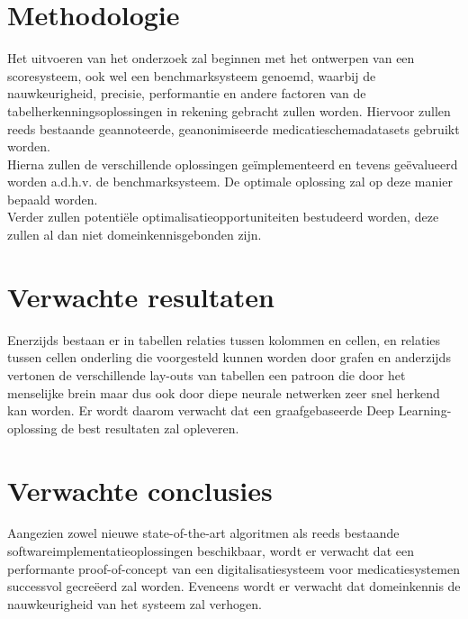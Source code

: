 \section{Methodologie}
\label{sec:methodologie}

Het uitvoeren van het onderzoek zal beginnen met het ontwerpen van een scoresysteem, ook wel een benchmarksysteem genoemd, waarbij de nauwkeurigheid, precisie, performantie en andere factoren van de tabelherkenningsoplossingen in rekening gebracht zullen worden. Hiervoor zullen reeds bestaande geannoteerde, geanonimiseerde medicatieschemadatasets gebruikt worden. \\

\noindent Hierna zullen de verschillende oplossingen geïmplementeerd en tevens geëvalueerd worden a.d.h.v. de benchmarksysteem. De optimale oplossing zal op deze manier bepaald worden.\\

\noindent Verder zullen potentiële optimalisatieopportuniteiten bestudeerd worden, deze zullen al dan niet domeinkennisgebonden zijn.

\section{Verwachte resultaten}
\label{sec:verwachte_resultaten}

Enerzijds bestaan er in tabellen relaties tussen kolommen en cellen, en relaties tussen cellen onderling die voorgesteld kunnen worden door grafen en anderzijds vertonen de verschillende lay-outs van tabellen een patroon die door het menselijke brein maar dus ook door diepe neurale netwerken zeer snel herkend kan worden. Er wordt daarom verwacht dat een graafgebaseerde Deep Learning-oplossing de best resultaten zal opleveren.

\section{Verwachte conclusies}
\label{sec:verwachte_conclusies}

Aangezien zowel nieuwe state-of-the-art algoritmen als reeds bestaande softwareimplementatieoplossingen beschikbaar, wordt er verwacht dat een performante proof-of-concept van een digitalisatiesysteem voor medicatiesystemen successvol gecreëerd zal worden. Eveneens wordt er verwacht dat domeinkennis de nauwkeurigheid van het systeem zal verhogen. 


